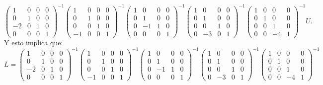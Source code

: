 \documentclass[11pt,letterpaper]{article}
\begin{document}
\begin{enumerate}
$$\left(\begin{array}{cccc}
1&0&0&0\\
0&1&0&0\\
-2&0&1&0\\
0&0&0&1
\end{array}\right)^{-1}\left(\begin{array}{cccc}
1&0&0&0\\
0&1&0&0\\
0&0&1&0\\
-1&0&0&1
\end{array} \right)^{-1}\left(\begin{array}{cccc}
1&0&0&0\\
0&1&0&0\\
0&-1&1&0\\
0&0&0&1
\end{array} \right)^{-1}\left(\begin{array}{cccc}
1&0&0&0\\
0&1&0&0\\
0&0&1&0\\
0&-3&0&1
\end{array} \right)^{-1}\left(\begin{array}{cccc}
1&0&0&0\\
0&1&0&0\\
0&0&1&0\\
0&0&-4&1
\end{array} \right)^{-1}U.$$
Y esto implica que:
$$L=\left(\begin{array}{cccc}
1&0&0&0\\
0&1&0&0\\
-2&0&1&0\\
0&0&0&1
\end{array}\right)^{-1}\left(\begin{array}{cccc}
1&0&0&0\\
0&1&0&0\\
0&0&1&0\\
-1&0&0&1
\end{array} \right)^{-1}\left(\begin{array}{cccc}
1&0&0&0\\
0&1&0&0\\
0&-1&1&0\\
0&0&0&1
\end{array} \right)^{-1}\left(\begin{array}{cccc}
1&0&0&0\\
0&1&0&0\\
0&0&1&0\\
0&-3&0&1
\end{array} \right)^{-1}\left(\begin{array}{cccc}
1&0&0&0\\
0&1&0&0\\
0&0&1&0\\
0&0&-4&1
\end{array} \right)^{-1}$$



\end{enumerate}
\end{document}
